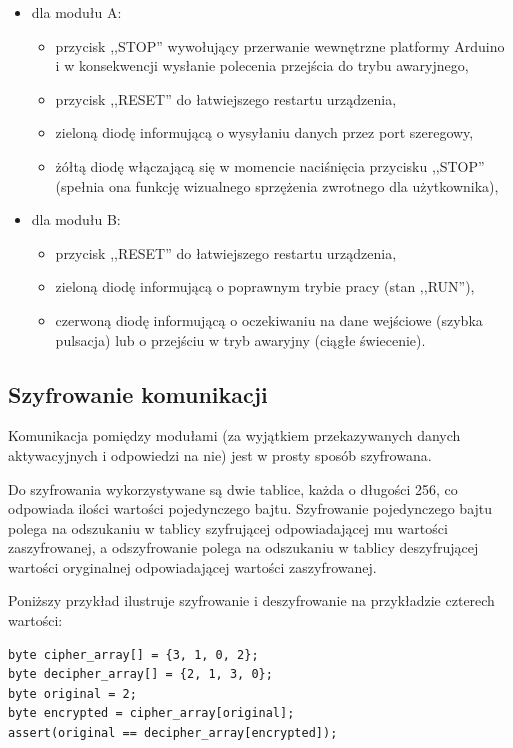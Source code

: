 \begin{itemize}
\item dla modułu A:
    \begin{itemize}
    \item przycisk ,,STOP'' wywołujący przerwanie wewnętrzne platformy Arduino i w konsekwencji wysłanie polecenia przejścia do trybu awaryjnego,
    \item przycisk ,,RESET'' do łatwiejszego restartu urządzenia,
    \item zieloną diodę informującą o wysyłaniu danych przez port szeregowy,
    \item żółtą diodę włączającą się w momencie naciśnięcia przycisku ,,STOP'' (spełnia ona funkcję wizualnego sprzężenia zwrotnego dla użytkownika),
    \end{itemize}
    
\item dla modułu B:
    \begin{itemize}
    \item przycisk ,,RESET'' do łatwiejszego restartu urządzenia,
    \item zieloną diodę informującą o poprawnym trybie pracy (stan ,,RUN''),
    \item czerwoną diodę informującą o oczekiwaniu na dane wejściowe (szybka pulsacja) lub o przejściu w tryb awaryjny (ciągłe świecenie).
    \end{itemize}
\end{itemize}

\subsection{Szyfrowanie komunikacji}
\label{subsec:szyfrowanie_komunikacji}

Komunikacja pomiędzy modułami (za wyjątkiem przekazywanych danych aktywacyjnych i odpowiedzi na nie) jest w prosty sposób szyfrowana.

Do szyfrowania wykorzystywane są dwie tablice, każda o długości 256, co odpowiada ilości wartości pojedynczego bajtu. Szyfrowanie pojedynczego bajtu polega na odszukaniu w tablicy szyfrującej odpowiadającej mu wartości zaszyfrowanej, a odszyfrowanie polega na odszukaniu w tablicy deszyfrującej wartości oryginalnej odpowiadającej wartości zaszyfrowanej.

Poniższy przykład ilustruje szyfrowanie i deszyfrowanie na przykładzie czterech wartości:

\begin{lstlisting}[frame=single,caption=Pseudokod zbliżony do C pokazujący zasadę szyfrowania i deszyfrowania komunikacji systemu ESAV.]
byte cipher_array[] = {3, 1, 0, 2};
byte decipher_array[] = {2, 1, 3, 0};
byte original = 2;
byte encrypted = cipher_array[original];
assert(original == decipher_array[encrypted]);
\end{lstlisting}

